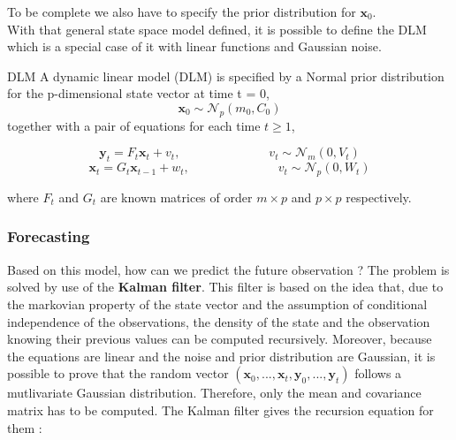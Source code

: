 \documentclass{article}
\begin{document}
To be complete we also have to specify the prior distribution for $\mathbf{x}_0$. \\

With that general state space model defined, it is possible to define the DLM which is a special case of it with linear functions and Gaussian noise. \\

\theoremstyle{definition}
\begin{definition}{DLM}
A dynamic linear model (DLM) is specified by a Normal prior distribution for the p-dimensional state vector at time t = 0,
$$\mathbf{x}_0 \sim \mathcal{N}_p(m_0, C_0)$$
together with a pair of equations for each time $t \ge 1$,

$$\mathbf{y}_t = F_t\mathbf{x}_t + v_t, \hspace{3cm} v_t \sim \mathcal{N}_m(0, V_t)$$
$$\mathbf{x}_t = G_t\mathbf{x}_{t-1} + w_t, \hspace{3cm} v_t \sim \mathcal{N}_p(0, W_t)$$

where $F_t$ and $G_t$ are known matrices of order $m \times p$ and $p \times p$ respectively.
\end{definition}

\subsubsection*{Forecasting}

Based on this model, how can we predict the future observation ? The problem is solved by use of the \textbf{Kalman filter}. This filter is based on the idea that, due to the markovian property of the state vector and the assumption of conditional independence of the observations, the density of the state and the observation knowing their previous values can be computed recursively. Moreover, because the equations are linear and the noise and prior distribution are Gaussian, it is possible to prove that the random vector $(\mathbf{x}_0, ..., \mathbf{x}_t, \mathbf{y}_0, ..., \mathbf{y}_t)$ follows a mutlivariate Gaussian distribution. Therefore, only the mean and covariance matrix has to be computed. The Kalman filter gives the recursion equation for them : \\
\end{document}
